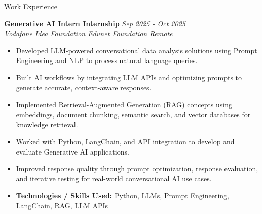 \documentclass{resume}
\begin{document}
\begin{rSection}{Work Experience}

{\bf Generative AI Intern \textbar{} Internship} \hfill {\em Sep 2025 - Oct 2025} \\
{\em Vodafone Idea Foundation \textbar{} Edunet Foundation} \hfill {\em Remote}
\begin{itemize}
    \vspace{-0.2cm}\item Developed LLM-powered conversational data analysis solutions using Prompt Engineering and NLP to process natural language queries.
    \vspace{-0.25cm}\item Built AI workflows by integrating LLM APIs and optimizing prompts to generate accurate, context-aware responses.
    \vspace{-0.25cm}\item Implemented Retrieval-Augmented Generation (RAG) concepts using embeddings, document chunking, semantic search, and vector databases for knowledge retrieval.
    \vspace{-0.25cm}\item Worked with Python, LangChain, and API integration to develop and evaluate Generative AI applications.
    \vspace{-0.25cm}\item Improved response quality through prompt optimization, response evaluation, and iterative testing for real-world conversational AI use cases.
    \vspace{-0.25cm}\item {\bf Technologies / Skills Used:} Python, LLMs, Prompt Engineering, LangChain, RAG, LLM APIs
\end{itemize}


\end{rSection}
\end{document}
